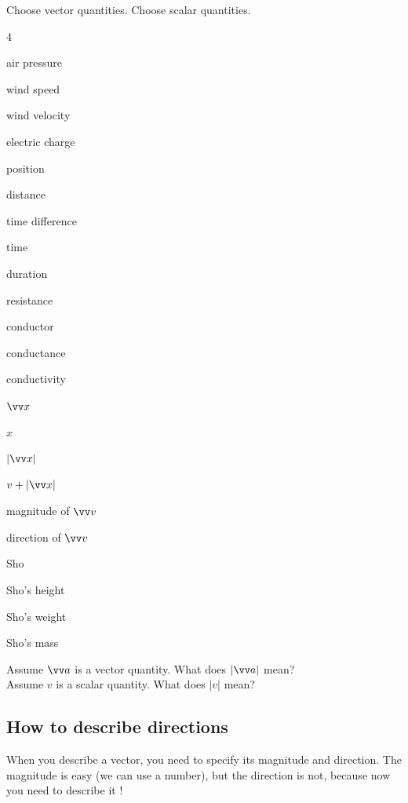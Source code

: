 \documentclass[11pt,pdfa,lastpage]{MishoNote}
\begin{document}
\begin{quizzes}
  \Quiz[S] Choose vector quantities. Choose scalar quantities.
  \begin{menumerate}[labelsep=0em,labelwidth=0em,itemindent=1em,label={},leftmargin=0.3em]{4}
    \item air pressure
    \item wind speed
    \item wind velocity
    \item electric charge
    \item position
    \item distance
    \item time difference
    \item time
    \item duration
    \item resistance
    \item conductor
    \item conductance
    \item conductivity
    \item $\vc x$
    \item $x$
    \item $|\vc x|$
    \item $v+|\vc x|$
    \item magnitude of $\vc v$
    \item direction of $\vc v$
    \item Sho
    \item Sho's height
    \item Sho's weight
    \item Sho's mass
  \end{menumerate}
  \Quiz[S]
    Assume $\vc a$ is a vector quantity. What does $|\vc a|$ mean?
   \\[.5em]\TAB
    Assume $v$ is a scalar quantity. What does $|v|$ mean?\\[.5em]
    \TAB\TAB{}
\end{quizzes}


\OutputNote

\subsection{How to describe directions}
When you describe a vector, you need to specify its magnitude and direction. The magnitude is easy (we can use a number), but the direction is not, because now you need to describe it !
\end{document}
